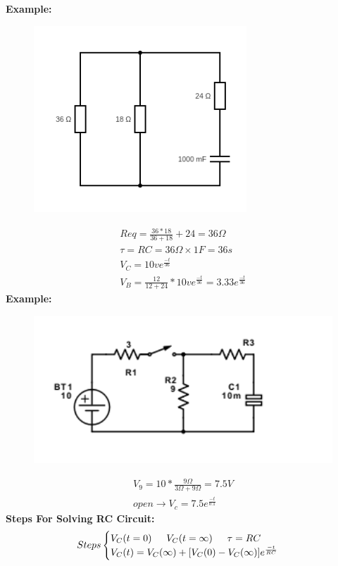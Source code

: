 \documentclass[a4paper,12]{article}
\begin{document}
  \textbf{Example:}
  \begin{figure}[H]
  \centering
  \includegraphics[width=80mm]{Image/29.jpeg}
  \end{figure}
  \begin{gather}
    Req=\frac{36*18}{36+18}+24=36\Omega \\
      \tau=RC=36\Omega \times 1F=36s\\
      V_C=10ve^{\frac{-t}{36}}\\
      V_B=\frac{12}{12+24}*10ve^{\frac{-t}{36}}=3.33e^{\frac{-t}{36}}
  \end{gather}
  \textbf{Example:}
  \begin{figure}[H]
      \centering
      \includegraphics[width=120mm]{Image/30.png}
  \end{figure}
  \begin{gather}
      V_9=10*\frac{9\Omega}{3\Omega +9\Omega}=7.5V\\
       open\rightarrow V_c=7.5e^{\frac{-t}{0.1}}
  \end{gather}
  \textbf{Steps For Solving RC Circuit: }
  \begin{gather*}
      Steps\begin{cases}
      V_C(t=0) \indent V_C(t=\infty) \indent \tau=RC\\
      V_C(t)=V_C(\infty)+[V_C(0)-V_C(\infty)]e^{\frac{-t}{RC}}\\
      \end{cases}
  \end{gather*}
\end{document}
